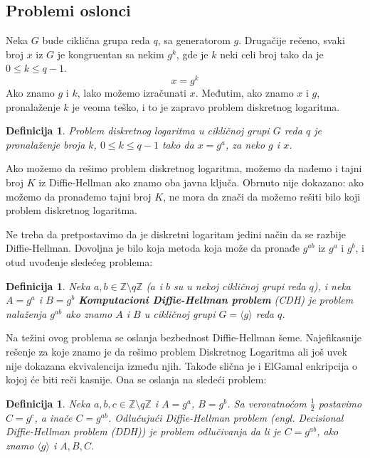 \documentclass[a4paper]{article}
\newtheorem{defn}[primer]{Definicija}
\begin{document}
\subsection{Problemi oslonci}
\label{subsec:problemi_oslonci}

Neka $G$ bude ciklična grupa reda $q$, sa generatorom $g$. Drugačije rečeno, svaki broj $x$ iz $G$ je 
kongruentan sa nekim $g^k$, gde je $k$ neki celi broj tako da je $0 \leq k \leq q - 1$.
\[x = g^k\]
Ako znamo $g$ i $k$, lako možemo izračunati $x$. Međutim, ako znamo $x$ i $g$, pronalaženje $k$ je veoma teško, 
i to je zapravo problem diskretnog logaritma.

\begin{defn}
Problem diskretnog logaritma u cikličnoj grupi $G$ reda $q$ je pronalaženje broja $k$, $0 \leq k \leq q - 1$ 
tako da $x = g^a$, za neko $g$ i $x$.
\end{defn}

Ako možemo da rešimo problem diskretnog logaritma, možemo da nađemo i tajni broj $K$ iz Diffie-Hellman ako znamo oba javna ključa.
Obrnuto nije dokazano: ako možemo da pronađemo tajni broj $K$, ne mora da znači da možemo rešiti bilo koji problem 
diskretnog logaritma.

Ne treba da pretpostavimo da je diskretni logaritam jedini način da se razbije Diffie-Hellman. 
Dovoljna je bilo koja metoda koja može da pronađe $g^{ab}$ iz $g^a$ i $g^b$, i otud uvođenje sledećeg problema:

\begin{defn}
    Neka $a,b\in \mathbb{Z}\setminus q\mathbb{Z}$ ($a$ i $b$ su u nekoj cikličnoj grupi reda $q$),
    i neka $A = g^a$ i $B = g^b$
    \textbf{Komputacioni Diffie-Hellman problem} (CDH) je problem nalaženja $g^{ab}$ ako znamo $A$ i $B$ u cikličnoj grupi
    $G = \langle g \rangle$ reda $q$.
\end{defn}

Na težini ovog problema se oslanja bezbednost Diffie-Hellman šeme.
Najefikasnije rešenje za koje znamo je da rešimo problem Diskretnog Logaritma 
ali još uvek nije dokazana ekvivalencija između njih. \cite{dlproblem}
Takođe slična je i ElGamal enkripcija o kojoj će biti reči kasnije. Ona se oslanja na sledeći problem:

\begin{defn}
    Neka $a,b,c\in \mathbb{Z}\setminus q\mathbb{Z}$ i $A = g^a$, $B = g^b$. Sa verovatnoćom $\frac{1}{2}$ postavimo $C = g^c$, 
    a inače $C = g^{ab}$. Odlučujući Diffie-Hellman problem (engl. \emph{Decisional Diffie-Hellman problem (DDH)}) je problem
    odlučivanja da li je $C = g^{ab}$, ako znamo $\langle g \rangle$ i $A, B, C$.
\end{defn}
\end{document}
